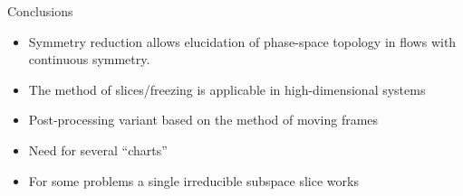 \begin{frame}{Conclusions}

\begin{block}{}
 \begin{itemize}
  \item Symmetry reduction allows elucidation of phase-space topology in flows with continuous symmetry.
  \item The method of slices/freezing is applicable in high-dimensional systems
  \item Post-processing variant based on the method of moving frames
  \item Need for several ``charts''
  \item For some problems a single irreducible subspace slice works 
 \end{itemize}
\end{block} 



\end{frame}






